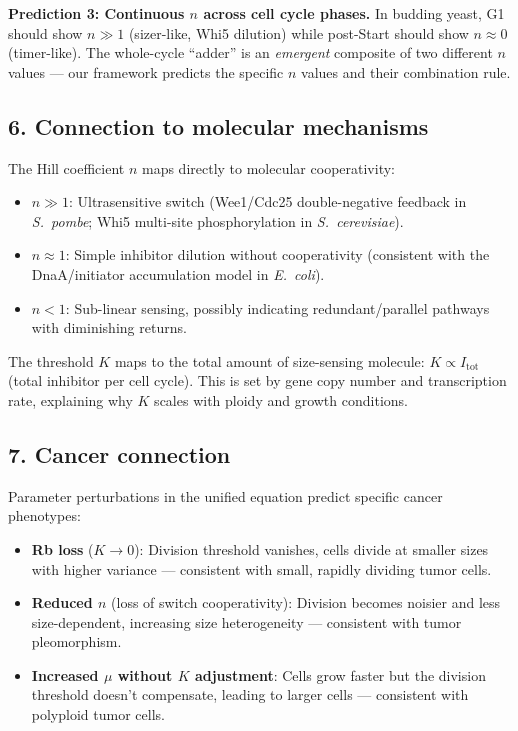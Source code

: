 \documentclass[11pt]{article}
\begin{document}
\textbf{Prediction 3: Continuous $n$ across cell cycle phases.}
In budding yeast, G1 should show $n \gg 1$ (sizer-like, Whi5 dilution) while
post-Start should show $n \approx 0$ (timer-like). The whole-cycle ``adder''
is an \emph{emergent} composite of two different $n$ values --- our framework
predicts the specific $n$ values and their combination rule.

\subsection*{6. Connection to molecular mechanisms}

The Hill coefficient $n$ maps directly to molecular cooperativity:
\begin{itemize}
  \item $n \gg 1$: Ultrasensitive switch (Wee1/Cdc25 double-negative feedback in
        \textit{S.~pombe}; Whi5 multi-site phosphorylation in \textit{S.~cerevisiae}).
  \item $n \approx 1$: Simple inhibitor dilution without cooperativity
        (consistent with the DnaA/initiator accumulation model in \textit{E.~coli}).
  \item $n < 1$: Sub-linear sensing, possibly indicating redundant/parallel
        pathways with diminishing returns.
\end{itemize}

The threshold $K$ maps to the total amount of size-sensing molecule:
$K \propto I_{\mathrm{tot}}$ (total inhibitor per cell cycle). This is set by
gene copy number and transcription rate, explaining why $K$ scales with
ploidy and growth conditions.

\subsection*{7. Cancer connection}

Parameter perturbations in the unified equation predict specific cancer phenotypes:
\begin{itemize}
  \item \textbf{Rb loss} ($K \to 0$): Division threshold vanishes, cells divide
        at smaller sizes with higher variance --- consistent with small, rapidly
        dividing tumor cells.
  \item \textbf{Reduced $n$} (loss of switch cooperativity): Division becomes
        noisier and less size-dependent, increasing size heterogeneity ---
        consistent with tumor pleomorphism.
  \item \textbf{Increased $\mu$ without $K$ adjustment}: Cells grow faster but
        the division threshold doesn't compensate, leading to larger cells ---
        consistent with polyploid tumor cells.
\end{itemize}
\end{document}
